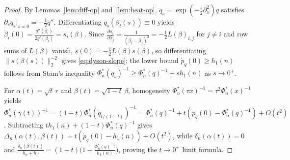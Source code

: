 \documentclass[11pt,a4paper]{article}
\theoremstyle{definition}
\begin{document}
\begin{proof}
By Lemmas~\ref{lem:diff-op} and~\ref{lem:heat-op}, $q_s = \exp(-\frac{s}{2}\partial_x^2) q$ satisfies $\partial_s q_s|_{s=0} = -\frac{1}{2}q''$. Differentiating $q_s(\beta_i(s)) \equiv 0$ yields $\dot{\beta}_i(0) = \frac{q''(\beta_i)}{2q'(\beta_i)} = s_i(\beta)$. Since $\frac{\partial s_i}{\partial \beta_j} = \frac{1}{(\beta_i-\beta_j)^2} = -\frac{1}{2}L(\beta)_{i,j}$ for $j \neq i$ and row sums of $L(\beta)$ vanish, $\dot{s}(0) = -\frac{1}{2} L(\beta) s(\beta)$, so differentiating $\|s(\beta(s))\|_2^{-2}$ gives \eqref{eq:dyson-slope}; the lower bound $\dot{p}_q(0) \ge h_1(n)$ follows from Stam's inequality $\Phi_n^*(q_s)^{-1} \ge \Phi_n^*(q)^{-1} + s h_1(n)$ as $s \to 0^+$.

For $\alpha(t) = \sqrt{t}\,r$ and $\beta(t) = \sqrt{1-t}\,\beta$, homogeneity $\Phi_n^*(\tau x)^{-1} = \tau^2 \Phi_n^*(x)^{-1}$ yields $\Phi_n^*(\gamma(t))^{-1} = (1-t)\Phi_n^*(q_{t/(1-t)})^{-1} = \Phi_n^*(q)^{-1} + t(\dot{p}_q(0) - \Phi_n^*(q)^{-1}) + O(t^2)$. Subtracting $t h_1(n) + (1-t)\Phi_n^*(q)^{-1}$ gives $\Delta_n(\alpha(t),\beta(t)) = t(\dot{p}_q(0) - h_1(n)) + O(t^2)$, while $\delta_n(\alpha(t)) = 0$ and $\frac{\delta_n(\beta(t))}{h_\alpha + h_\beta} = (1-t)\big(1 - \frac{\Phi_n^*(q)^{-1}}{h_1(n)}\big)$, proving the $t \to 0^+$ limit formula.


\end{proof}
\end{document}
